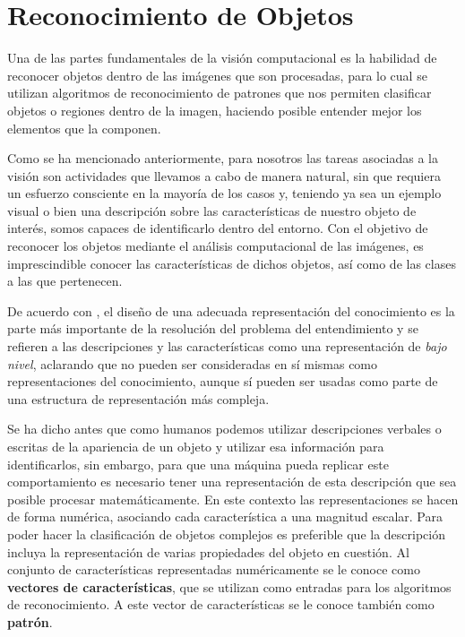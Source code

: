 \section{Reconocimiento de Objetos}
Una de las partes fundamentales de la visión computacional es la habilidad de reconocer objetos dentro de las imágenes que son procesadas, para lo cual se utilizan algoritmos de reconocimiento de patrones que nos permiten clasificar objetos o regiones dentro de la imagen, haciendo posible entender mejor los elementos que la componen.

Como se ha mencionado anteriormente, para nosotros las tareas asociadas a la visión son actividades que llevamos a cabo de manera natural, sin que requiera un esfuerzo consciente en la mayoría de los casos y, teniendo ya sea un ejemplo visual o bien una descripción sobre las características de nuestro objeto de interés, somos capaces de identificarlo dentro del entorno. Con el objetivo de reconocer los objetos mediante el análisis computacional de las imágenes, es imprescindible conocer las características de dichos objetos, así como de las clases a las que pertenecen.

De acuerdo con \cite{sonka_image_2008}, el diseño de una adecuada representación del conocimiento es la parte más importante de la resolución del problema del entendimiento y se refieren a las descripciones y las características como una representación de \textit{bajo nivel}, aclarando que no pueden ser consideradas en sí mismas como representaciones del conocimiento, aunque sí pueden ser usadas como parte de una estructura de representación más compleja.

Se ha dicho antes que como humanos podemos utilizar descripciones verbales o escritas de la apariencia de un objeto y utilizar esa información para identificarlos, sin embargo, para que una máquina pueda replicar este comportamiento es necesario tener  una representación de esta descripción que sea posible procesar matemáticamente. En este contexto las representaciones se hacen de forma numérica, asociando cada característica a una magnitud escalar. 
Para poder hacer la clasificación de objetos complejos es preferible que la descripción incluya la representación de varias propiedades del objeto en cuestión. Al conjunto de características representadas numéricamente se le conoce como \textbf{vectores de características}, que se utilizan como entradas para los algoritmos de reconocimiento. A este vector de características se le conoce también como \textbf{patrón}.

